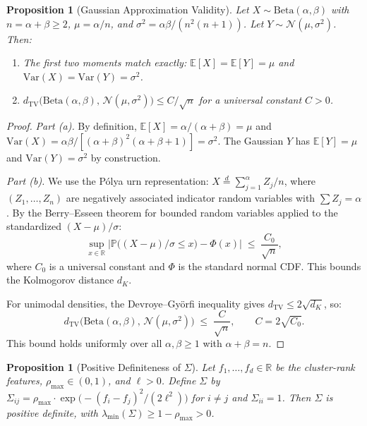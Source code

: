 \documentclass{article}
\theoremstyle{plain}
\newtheorem{proposition}[theorem]{Proposition}
\theoremstyle{definition}
\theoremstyle{remark}
\newcommand{\R}{\mathbb{R}}
\newcommand{\E}{\mathbb{E}}
\newcommand{\Prob}{\mathbb{P}}
\begin{document}
\begin{proposition}[Gaussian Approximation Validity]\label{prop:gaussian}
Let $X \sim \mathrm{Beta}(\alpha, \beta)$ with $n = \alpha + \beta \geq 2$, $\mu = \alpha/n$, and $\sigma^2 = \alpha\beta/(n^2(n+1))$.
Let $Y \sim \mathcal{N}(\mu, \sigma^2)$.
Then:
\begin{enumerate}
\item[\textnormal{(a)}] The first two moments match exactly: $\E[X] = \E[Y] = \mu$ and $\mathrm{Var}(X) = \mathrm{Var}(Y) = \sigma^2$.
\item[\textnormal{(b)}] $d_{\mathrm{TV}}\!\bigl(\mathrm{Beta}(\alpha,\beta),\, \mathcal{N}(\mu,\sigma^2)\bigr) \leq C / \sqrt{n}$ for a universal constant $C > 0$.
\end{enumerate}
\end{proposition}

\begin{proof}
\textit{Part (a).}\;
By definition, $\E[X] = \alpha/(\alpha+\beta) = \mu$ and
$\mathrm{Var}(X) = \alpha\beta / [(\alpha+\beta)^2(\alpha+\beta+1)] = \sigma^2$.
The Gaussian $Y$ has $\E[Y] = \mu$ and $\mathrm{Var}(Y) = \sigma^2$ by construction.

\textit{Part (b).}\;
We use the P\'{o}lya urn representation:
$X \overset{d}{=} \sum_{j=1}^{\alpha} Z_j / n$,
where $(Z_1, \ldots, Z_n)$ are negatively associated indicator random variables with $\sum Z_j = \alpha$.
By the Berry--Esseen theorem for bounded random variables applied to the standardized $(X - \mu)/\sigma$:
\[
\sup_{x \in \R} \bigl|\Prob\bigl((X - \mu)/\sigma \leq x\bigr) - \Phi(x)\bigr|
  \;\leq\; \frac{C_0}{\sqrt{n}},
\]
where $C_0$ is a universal constant and $\Phi$ is the standard normal CDF.
This bounds the Kolmogorov distance $d_K$.

For unimodal densities, the Devroye--Gy\"{o}rfi inequality gives $d_{\mathrm{TV}} \leq 2\sqrt{d_K}$, so:
\[
d_{\mathrm{TV}}\!\bigl(\mathrm{Beta}(\alpha,\beta),\, \mathcal{N}(\mu,\sigma^2)\bigr)
  \;\leq\; \frac{C}{\sqrt{n}},
  \qquad C = 2\sqrt{C_0}.
\]
This bound holds uniformly over all $\alpha, \beta \geq 1$ with $\alpha + \beta = n$.
\end{proof}

\medskip

\begin{proposition}[Positive Definiteness of $\Sigma$]\label{prop:pd}
Let $f_1, \ldots, f_d \in \R$ be the cluster-rank features, $\rho_{\max} \in (0,1)$, and $\ell > 0$.
Define $\Sigma$ by $\Sigma_{ij} = \rho_{\max} \cdot \exp\!\bigl(-(f_i - f_j)^2/(2\ell^2)\bigr)$ for $i \neq j$ and $\Sigma_{ii} = 1$.
Then $\Sigma$ is positive definite, with $\lambda_{\min}(\Sigma) \geq 1 - \rho_{\max} > 0$.
\end{proposition}
\end{document}

